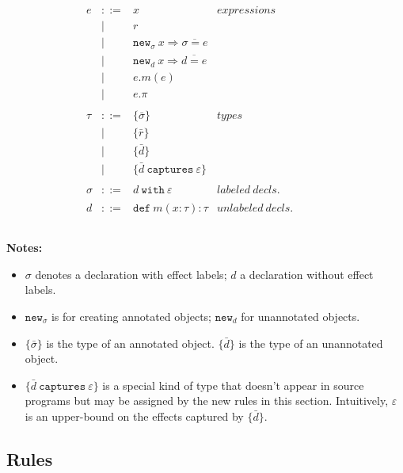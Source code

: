 \documentclass{llncs}
\newcommand{\keywadj}[1]{\mathtt{#1}}
\newcommand{\keyw}[1]{\keywadj{#1}~}
\begin{document}
\[
\begin{array}{lll}

\begin{array}{lllr}

e & ::= & x & expressions \\
  		& | & r \\
		& | & \keywadj{new}_\sigma~x \Rightarrow \overline{\sigma = e} \\
 		& | & \keywadj{new}_d~x \Rightarrow \overline{d = e} \\
 		& | & e.m(e)\\
 		& | & e.\pi\\
		&&\\

\tau & ::= & \{ \bar \sigma \} & types \\
		& | & \{ \bar r \} \\
		& | & \{ \bar d \} \\
		& | & \{ \bar d ~\keyw{captures} \varepsilon \} \\
		&&\\
		
\sigma & ::= & d~\keyw{with}\varepsilon  & labeled~ decls.\\
		&&\\

d & ::= & \keyw{def} m(x:\tau):\tau & unlabeled~decls.\\
		&&\\

\end{array}
& ~~~~~~
&
\end{array}
\]

\noindent \textbf{Notes:}
\begin{itemize}
	\item $\sigma$ denotes a declaration with effect labels; $d$ a declaration without effect labels.
	\item $\keywadj{new}_\sigma$ is for creating annotated objects; $\keywadj{new}_d$ for unannotated objects.
	\item $\{ \bar \sigma \}$ is the type of an annotated object. $\{ \bar d \}$ is the type of an unannotated object.
	\item $\{ \bar d ~\keyw{captures} \varepsilon \}$ is a special kind of type that doesn't appear in source programs but may be assigned by the new rules in this section. Intuitively, $\varepsilon$ is an upper-bound on the effects captured by $\{ \bar d \}$.
\end{itemize}

\subsection{Rules}
\end{document}
